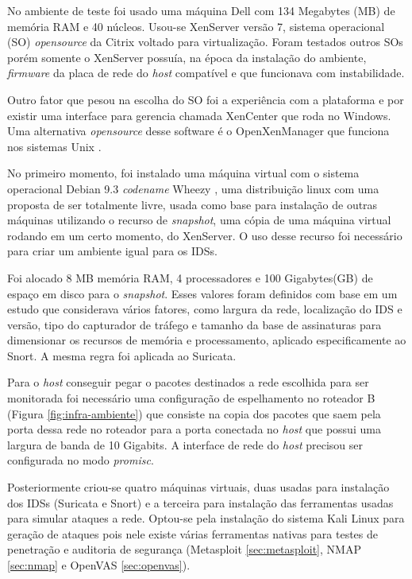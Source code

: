 No ambiente de teste foi usado uma máquina Dell com 134 Megabytes (MB) de memória RAM e 40 núcleos. Usou-se XenServer \cite{xenserver} versão 7, sistema operacional (SO) \textit{opensource} da Citrix voltado para virtualização. Foram testados outros SOs porém somente o XenServer possuía, na época da instalação do ambiente, \textit{firmware} da placa de rede do \textit{host} compatível e que funcionava com instabilidade. 
 
Outro fator que pesou na escolha do SO foi a experiência com a plataforma e por existir uma interface para gerencia chamada XenCenter que roda no Windows. Uma alternativa \textit{opensource} desse software é o OpenXenManager que funciona nos sistemas Unix \cite{openxenmanager}.

No primeiro momento, foi instalado uma máquina virtual com o sistema operacional Debian 9.3 \textit{codename} Wheezy \cite{debianwheezy}, uma distribuição linux com uma proposta de ser totalmente livre, usada como base para instalação de outras máquinas utilizando o recurso de \textit{snapshot}, uma cópia de uma máquina virtual rodando em um certo momento, do XenServer. O uso desse recurso foi necessário para criar um ambiente igual para os IDSs.

Foi alocado 8 MB memória RAM, 4 processadores e 100 Gigabytes(GB) de espaço em disco para o \textit{snapshot}. Esses valores foram definidos com base em um estudo \cite{mikelococo} que considerava vários fatores, como largura da rede, localização do IDS e versão, tipo do capturador de tráfego e tamanho da base de assinaturas para dimensionar os recursos de memória e processamento, aplicado especificamente ao Snort. A mesma regra foi aplicada ao Suricata.

Para o \textit{host} conseguir pegar o pacotes destinados a rede escolhida para ser monitorada foi necessário uma configuração de espelhamento no roteador B (Figura \ref{fig:infra-ambiente}) que consiste na copia dos pacotes que saem pela porta dessa rede no roteador para a porta conectada no \textit{host} que possui uma largura de banda de 10 Gigabits. A interface de rede do \textit{host} precisou ser configurada no modo \textit{promisc}.

Posteriormente criou-se quatro máquinas virtuais, duas usadas para instalação dos IDSs (Suricata e Snort) e a terceira para instalação das ferramentas usadas para simular ataques a rede. Optou-se pela instalação do sistema Kali Linux \cite{kalilinux} para geração de ataques pois nele existe várias ferramentas nativas para testes de penetração e auditoria de segurança (Metasploit \autoref{sec:metasploit}, NMAP \autoref{sec:nmap} e OpenVAS \autoref{sec:openvas}). 

